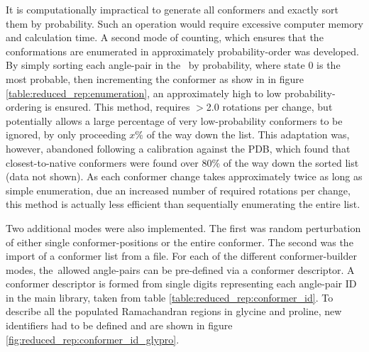 It is computationally impractical to generate all conformers and exactly sort them by probability. Such an operation would require excessive computer  memory and calculation time. A second mode of counting, which ensures that the conformations are enumerated in approximately probability-order was developed.  By simply sorting each angle-pair in the \angleset\ by probability, where state 0 is the most probable, then incrementing the conformer as show in in figure \ref{table:reduced_rep:enumeration}, an approximately high to low probability-ordering is ensured. This method, requires $>$2.0 rotations per change, but potentially allows a large percentage of very low-probability conformers to be ignored, by only proceeding $x\%$ of the way down the list. This adaptation was, however, abandoned following a calibration against the PDB, which found that closest-to-native conformers were found over 80\% of the way down the sorted list (data not shown). As each conformer change takes approximately twice as long as simple enumeration, due an increased number of required rotations per change, this method is actually less efficient than sequentially enumerating the entire list.  

Two additional modes were also implemented. The first was random perturbation of either single conformer-positions or the entire conformer. The second was the import of a conformer list from a file. For each of the different conformer-builder modes, the~allowed angle-pairs can be pre-defined via a conformer descriptor. A conformer descriptor is formed from single digits representing each angle-pair ID in the main library, taken from table \ref{table:reduced_rep:conformer_id}. To describe all the populated Ramachandran regions in glycine and proline, new identifiers had to be defined and are shown in figure \ref{fig:reduced_rep:conformer_id_glypro}.

